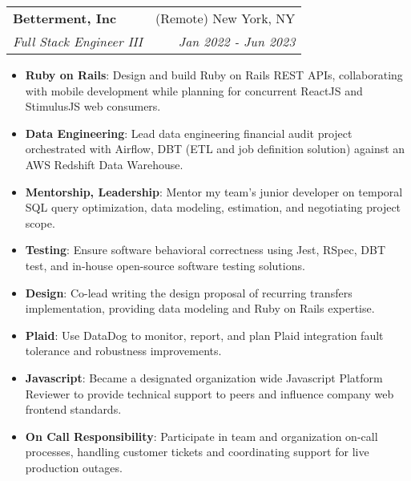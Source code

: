\documentclass[letterpaper,11pt]{article}
\makeatletter
\newcommand{\resumeItem}[2]{
  \item\small{
    \textbf{#1}{: #2 \vspace{-2pt}}
  }
}
\newcommand{\resumeSubheading}[4]{
  \vspace{-1pt}\item
    \begin{tabular*}{0.97\textwidth}{l@{\extracolsep{\fill}}r}
      \textbf{#1} & #2 \\
      \textit{\small#3} & \textit{\small #4} \\
    \end{tabular*}\vspace{-5pt}
}
\newcommand{\resumeItemListStart}{\begin{itemize}}
\newcommand{\resumeItemListEnd}{\end{itemize}\vspace{-5pt}}
\makeatother
\begin{document}
    \resumeSubheading
      {Betterment, Inc}{(Remote) New York, NY}
      {Full Stack Engineer III}{Jan 2022 - Jun 2023}
      \resumeItemListStart
        \resumeItem{Ruby on Rails}
          {Design and build Ruby on Rails REST APIs, collaborating with mobile development while planning for concurrent ReactJS and StimulusJS web consumers.}
        \resumeItem{Data Engineering}
          {Lead data engineering financial audit project orchestrated with Airflow, DBT (ETL and job definition solution) against an AWS Redshift Data Warehouse.}
        \resumeItem{Mentorship, Leadership}
          {Mentor my team's junior developer on temporal SQL query optimization, data modeling, estimation, and negotiating project scope.}
        \resumeItem{Testing}
          {Ensure software behavioral correctness using Jest, RSpec, DBT test, and in-house open-source software testing solutions.}
        \resumeItem{Design}
          {Co-lead writing the design proposal of recurring transfers implementation, providing data modeling and Ruby on Rails expertise.}
        \resumeItem{Plaid}
          {Use DataDog to monitor, report, and plan Plaid integration fault tolerance and robustness improvements.}
        \resumeItem{Javascript}
          {Became a designated organization wide Javascript Platform Reviewer to provide technical support to peers and influence company web frontend standards.}
        \resumeItem{On Call Responsibility}
          {Participate in team and organization on-call processes, handling customer tickets and coordinating support for live production outages.}
      \resumeItemListEnd
\end{document}

